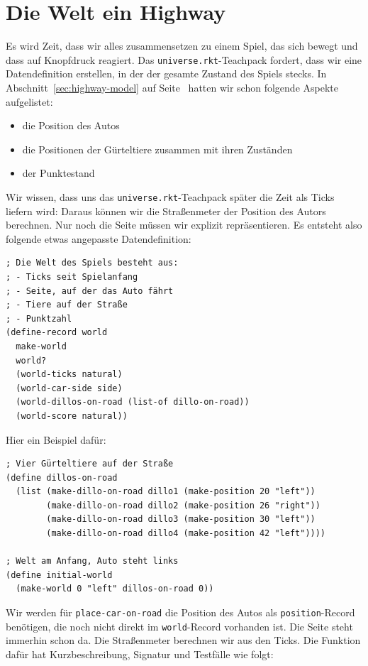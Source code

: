 \section{Die Welt ein Highway}

Es wird Zeit, dass wir alles zusammensetzen zu einem Spiel, das sich
bewegt und dass auf Knopfdruck reagiert.  Das
\texttt{universe.rkt}-Teachpack fordert, dass wir eine Datendefinition
erstellen, in der der gesamte Zustand des Spiels stecks.  In
Abschnitt~\ref{sec:highway-model} auf
Seite~\pageref{sec:highway-model} hatten wir schon folgende Aspekte
aufgelistet:
%
\begin{itemize}
\item die Position des Autos
\item die Positionen der Gürteltiere zusammen mit ihren Zuständen
\item der Punktestand
\end{itemize}
%
Wir wissen, dass uns das \texttt{universe.rkt}-Teachpack später die
Zeit als Ticks liefern wird: Daraus können wir die Straßenmeter der
Position des Autors berechnen.  Nur noch die Seite müssen wir explizit
repräsentieren.  Es entsteht also folgende etwas angepasste Datendefinition:
%
\begin{lstlisting}
; Die Welt des Spiels besteht aus:
; - Ticks seit Spielanfang
; - Seite, auf der das Auto fährt
; - Tiere auf der Straße
; - Punktzahl
(define-record world
  make-world
  world?
  (world-ticks natural)
  (world-car-side side)
  (world-dillos-on-road (list-of dillo-on-road))
  (world-score natural))
\end{lstlisting}
%
Hier ein Beispiel dafür:
%
\begin{lstlisting}
; Vier Gürteltiere auf der Straße
(define dillos-on-road
  (list (make-dillo-on-road dillo1 (make-position 20 "left"))
        (make-dillo-on-road dillo2 (make-position 26 "right"))
        (make-dillo-on-road dillo3 (make-position 30 "left"))
        (make-dillo-on-road dillo4 (make-position 42 "left"))))

; Welt am Anfang, Auto steht links
(define initial-world
  (make-world 0 "left" dillos-on-road 0))
\end{lstlisting}
%
Wir werden für \lstinline{place-car-on-road} die Position des Autos
als \lstinline{position}-Record benötigen, die noch nicht direkt im
\lstinline{world}-Record vorhanden ist.  Die Seite steht immerhin
schon da.  Die Straßenmeter berechnen wir aus den Ticks.  Die Funktion
dafür hat Kurzbeschreibung, Signatur und Testfälle wie folgt:
